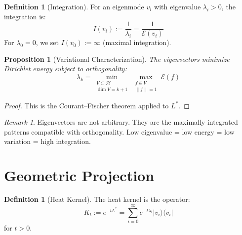 \documentclass[11pt,a4paper]{article}
\theoremstyle{plain}
\newtheorem{proposition}[theorem]{Proposition}
\theoremstyle{definition}
\newtheorem{definition}[theorem]{Definition}
\theoremstyle{remark}
\newtheorem{remark}[theorem]{Remark}
\newcommand{\Hilbert}{\mathcal{H}}
\newcommand{\Laplacian}{L^*}
\newcommand{\norm}[1]{\| #1 \|}
\begin{document}
\begin{definition}[Integration]\label{def:integration}
For an eigenmode $v_i$ with eigenvalue $\lambda_i > 0$, the integration is:
\begin{equation}
I(v_i) := \frac{1}{\lambda_i} = \frac{1}{\mathcal{E}(v_i)}
\end{equation}
For $\lambda_0 = 0$, we set $I(v_0) := \infty$ (maximal integration).
\end{definition}

\begin{proposition}[Variational Characterization]\label{prop:variational}
The eigenvectors minimize Dirichlet energy subject to orthogonality:
\[
\lambda_k = \min_{\substack{V \subset \Hilbert \\ \dim V = k+1}} \max_{\substack{f \in V \\ \norm{f} = 1}} \mathcal{E}(f)
\]
\end{proposition}

\begin{proof}
This is the Courant--Fischer theorem applied to $\Laplacian$.
\end{proof}

\begin{remark}
Eigenvectors are not arbitrary. They are the maximally integrated patterns compatible with orthogonality. Low eigenvalue = low energy = low variation = high integration.
\end{remark}

\section{Geometric Projection}

\begin{definition}[Heat Kernel]\label{def:heat}
The heat kernel is the operator:
\begin{equation}
K_t := e^{-t\Laplacian} = \sum_{i=0}^{\infty} e^{-t\lambda_i} |v_i\rangle\langle v_i|
\end{equation}
for $t > 0$.
\end{definition}
\end{document}
